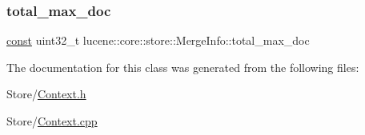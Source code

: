 \subsubsection{\texorpdfstring{total\+\_\+max\+\_\+doc}{total\_max\_doc}}
{\footnotesize\ttfamily \mbox{\hyperlink{ZlibCrc32_8h_a2c212835823e3c54a8ab6d95c652660e}{const}} uint32\+\_\+t lucene\+::core\+::store\+::\+Merge\+Info\+::total\+\_\+max\+\_\+doc}



The documentation for this class was generated from the following files\+:\begin{DoxyCompactItemize}
\item 
Store/\mbox{\hyperlink{Context_8h}{Context.\+h}}\item 
Store/\mbox{\hyperlink{Context_8cpp}{Context.\+cpp}}\end{DoxyCompactItemize}

